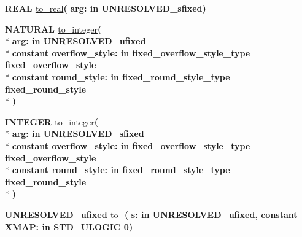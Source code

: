 \begin{DoxyCompactItemize}
\item 
{\bfseries {\bfseries \textcolor{comment}{R\+E\+A\+L}\textcolor{vhdlchar}{ }}} \hyperlink{class__fixed__pkg_a5a07993e8b679308d776fe3fd1b67eb7}{to\+\_\+real}{\bfseries  ( }{\bfseries \textcolor{vhdlchar}{arg\+: }\textcolor{stringliteral}{in }\textcolor{vhdlchar}{U\+N\+R\+E\+S\+O\+L\+V\+E\+D\+\_\+sfixed}}{\bfseries  )} 
\item 
{\bfseries {\bfseries \textcolor{comment}{N\+A\+T\+U\+R\+A\+L}\textcolor{vhdlchar}{ }}} \hyperlink{class__fixed__pkg_a5198b212bc0f81a037389f568aefa7c6}{to\+\_\+integer}{\bfseries  ( }\\*
{\bfseries \textcolor{vhdlchar}{arg\+: }\textcolor{stringliteral}{in }\textcolor{vhdlchar}{U\+N\+R\+E\+S\+O\+L\+V\+E\+D\+\_\+ufixed}}\\*
{\bfseries {\bfseries \textcolor{keywordflow}{constant}\textcolor{vhdlchar}{ }}\textcolor{vhdlchar}{overflow\+\_\+style\+: }\textcolor{stringliteral}{in }\textcolor{vhdlchar}{fixed\+\_\+overflow\+\_\+style\+\_\+type     fixed\+\_\+overflow\+\_\+style}}\\*
{\bfseries {\bfseries \textcolor{keywordflow}{constant}\textcolor{vhdlchar}{ }}\textcolor{vhdlchar}{round\+\_\+style\+: }\textcolor{stringliteral}{in }\textcolor{vhdlchar}{fixed\+\_\+round\+\_\+style\+\_\+type     fixed\+\_\+round\+\_\+style}}\\*
{\bfseries  )} 
\item 
{\bfseries {\bfseries \textcolor{comment}{I\+N\+T\+E\+G\+E\+R}\textcolor{vhdlchar}{ }}} \hyperlink{class__fixed__pkg_ac9431306d38abee05eb7d1bc4a5f19b2}{to\+\_\+integer}{\bfseries  ( }\\*
{\bfseries \textcolor{vhdlchar}{arg\+: }\textcolor{stringliteral}{in }\textcolor{vhdlchar}{U\+N\+R\+E\+S\+O\+L\+V\+E\+D\+\_\+sfixed}}\\*
{\bfseries {\bfseries \textcolor{keywordflow}{constant}\textcolor{vhdlchar}{ }}\textcolor{vhdlchar}{overflow\+\_\+style\+: }\textcolor{stringliteral}{in }\textcolor{vhdlchar}{fixed\+\_\+overflow\+\_\+style\+\_\+type     fixed\+\_\+overflow\+\_\+style}}\\*
{\bfseries {\bfseries \textcolor{keywordflow}{constant}\textcolor{vhdlchar}{ }}\textcolor{vhdlchar}{round\+\_\+style\+: }\textcolor{stringliteral}{in }\textcolor{vhdlchar}{fixed\+\_\+round\+\_\+style\+\_\+type     fixed\+\_\+round\+\_\+style}}\\*
{\bfseries  )} 
\item 
{\bfseries {\bfseries \textcolor{vhdlchar}{U\+N\+R\+E\+S\+O\+L\+V\+E\+D\+\_\+ufixed}\textcolor{vhdlchar}{ }}} \hyperlink{class__fixed__pkg_a1a0ba551d5dae1edf3512dff88ca0d5d}{to\+\_}{\bfseries  ( }{\bfseries \textcolor{vhdlchar}{s\+: }\textcolor{stringliteral}{in }\textcolor{vhdlchar}{U\+N\+R\+E\+S\+O\+L\+V\+E\+D\+\_\+ufixed}}{\bfseries  , {\bfseries \textcolor{keywordflow}{constant}\textcolor{vhdlchar}{ }}\textcolor{vhdlchar}{X\+M\+A\+P\+: }\textcolor{stringliteral}{in }\textcolor{vhdlchar}{S\+T\+D\+\_\+\+U\+L\+O\+G\+I\+C   \textquotesingle{}0\textquotesingle{}}}{\bfseries  )} 

\end{DoxyCompactItemize}
